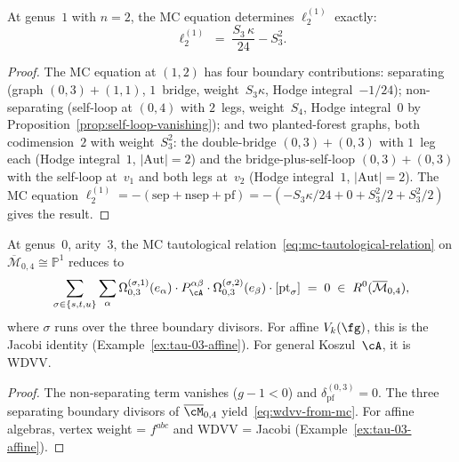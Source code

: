 \begin{proposition}
\label{prop:ell2-genus1-mc}
\ClaimStatusProvedHere
{}
At genus~$1$ with $n = 2$, the MC equation determines
$\ell_2^{(1)}$ exactly:
\begin{equation}\label{eq:ell2-genus1-exact}
\ell_2^{(1)}
\;=\;
\frac{S_3\,\kappa}{24} - S_3^2.
\end{equation}
\end{proposition}

\begin{proof}
The MC equation at $(1,2)$ has four boundary contributions:
separating (graph $(0,3){+}(1,1)$, $1$~bridge,
weight~$S_3\kappa$, Hodge integral~$-1/24$);
non-separating (self-loop at $(0,4)$ with $2$~legs,
weight~$S_4$, Hodge integral~$0$ by
Proposition~\ref{prop:self-loop-vanishing});
and two planted-forest graphs, both codimension~$2$ with
weight~$S_3^2$: the double-bridge $(0,3){+}(0,3)$ with
$1$~leg each (Hodge integral~$1$, $|\mathrm{Aut}| = 2$)
and the bridge-plus-self-loop $(0,3){+}(0,3)$ with the
self-loop at~$v_1$ and both legs at~$v_2$
(Hodge integral~$1$, $|\mathrm{Aut}| = 2$).
The MC equation $\ell_2^{(1)} = -(\text{sep} + \text{nsep}
+ \text{pf})
= -(-S_3\kappa/24 + 0 + S_3^2/2 + S_3^2/2)$ gives the result.
\end{proof}

\begin{proposition}
\label{prop:wdvv-from-mc}
\ClaimStatusProvedHere
{}
At genus~$0$, arity~$3$, the MC tautological
relation~\eqref{eq:mc-tautological-relation}
on $\overline{\mathcal{M}}_{0,4} \cong \mathbb{P}^1$
reduces to
\begin{equation}\label{eq:wdvv-from-mc}
\sum_{\sigma \in \{s,t,u\}}
\sum_\alpha
\Omega_{0,3}^{(\sigma,1)}(e_\alpha)
\cdot P_\cA^{\alpha\beta}
\cdot \Omega_{0,3}^{(\sigma,2)}(e_\beta)
\cdot [\mathrm{pt}_\sigma]
\;=\; 0
\;\in\; R^0(\overline{\mathcal{M}}_{0,4}),
\end{equation}
where $\sigma$ runs over the three boundary divisors.
For affine $V_k(\fg)$, this is the Jacobi identity
\textup{(}Example~\textup{\ref{ex:tau-03-affine}}\textup{)}.
For general Koszul~$\cA$, it is WDVV.
\end{proposition}

\begin{proof}
The non-separating term vanishes ($g - 1 < 0$)
and $\delta_{\mathrm{pf}}^{(0,3)} = 0$.
The three separating boundary
divisors of $\overline{\cM}_{0,4}$ yield~\eqref{eq:wdvv-from-mc}.
For affine algebras, vertex weight = $f^{abc}$ and
WDVV = Jacobi (Example~\ref{ex:tau-03-affine}).
\end{proof}

